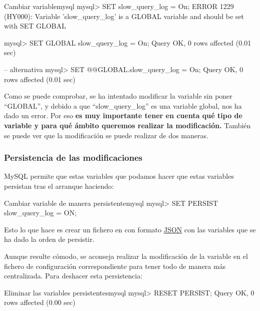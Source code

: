 \begin{mycode}{Cambiar variable}{mysql}{}
mysql> SET slow_query_log = On;
ERROR 1229 (HY000): Variable 'slow_query_log' is a GLOBAL variable
and should be set with SET GLOBAL


mysql> SET GLOBAL slow_query_log = On;
Query OK, 0 rows affected (0.01 sec)

-- alternativa
mysql> SET @@GLOBAL.slow_query_log = On;
Query OK, 0 rows affected (0.01 sec)
\end{mycode}

Como se puede comprobar, se ha intentado modificar la variable sin poner “GLOBAL”, y debido a que “slow\_query\_log” es una variable global, nos ha dado un error. Por eso \textbf{es muy importante tener en cuenta qué tipo de variable y para qué ámbito queremos realizar la modificación.} También se puede ver que la modificación se puede realizar de dos maneras.


\subsubsection{Persistencia de las modificaciones}
MySQL permite que estas variables que podamos hacer que estas variables persistan tras el arranque haciendo:

\begin{mycode}{Cambiar variable de manera persistente}{mysql}{}
mysql> SET PERSIST slow_query_log  = ON;
\end{mycode}

Esto lo que hace es crear un fichero en  con formato \hyperlink{json}{JSON} con las variables que se ha dado la orden de persistir.


Aunque resulte cómodo, se aconseja realizar la modificación de la variable en el fichero de configuración correspondiente para tener todo de manera más centralizada. Para deshacer esta persistencia:

\begin{mycode}{Eliminar las variables persistentes}{mysql}{}
mysql> RESET PERSIST;
Query OK, 0 rows affected (0.00 sec)
\end{mycode}

